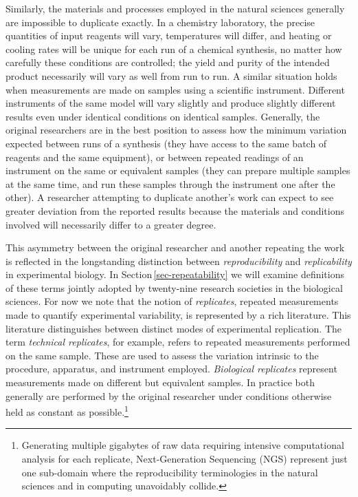 Similarly, the materials and processes employed in the natural sciences generally are impossible
	to duplicate exactly.
In a chemistry laboratory, the precise quantities of input reagents will vary, temperatures will differ, and heating
	or cooling rates will be unique for each run of a chemical synthesis, no matter how carefully these conditions
	are controlled; the yield and purity of the intended product necessarily will vary as well from run to run.
A similar situation holds when measurements are made on samples using a scientific instrument. 
Different instruments of the same model will vary slightly and produce slightly different results even
	under identical conditions on identical samples.
Generally, the original researchers are in the best position to assess how the minimum variation expected
	between runs of a synthesis (they have access to the same batch of reagents and the same equipment), 
	or between repeated readings of an instrument on the same or equivalent samples (they can prepare
	multiple samples at the same time, and run these samples through the instrument one after the other).
A researcher attempting to duplicate another's work can expect to see greater deviation from the reported results	
	because the materials and conditions involved will necessarily differ to a greater degree.

This asymmetry between the original researcher and another repeating the work is reflected in the longstanding
	distinction between \emph{reproducibility} and \emph{replicability} in experimental biology.  
In  Section\,\ref{sec-repeatability}  we will examine definitions of these terms jointly adopted by twenty-nine research
	societies in the biological sciences.  
For now we note that the notion of \emph{replicates}, repeated measurements made to quantify 
	experimental variability, is represented by a rich literature.
This literature distinguishes between distinct modes of experimental replication.
The term \emph{technical replicates}, for example, refers to repeated measurements performed on the same sample.
These are used to assess the variation intrinsic to the procedure, apparatus, and instrument employed.
\emph{Biological replicates} represent measurements made on different but equivalent samples.
In practice both generally are performed by the original researcher under conditions otherwise
	held as constant as possible.\footnote{Generating multiple gigabytes of raw data requiring intensive computational analysis for each replicate, Next-Generation Sequencing (NGS) represent just one sub-domain where the reproducibility 
	terminologies in the natural sciences and in computing
        unavoidably collide.}



